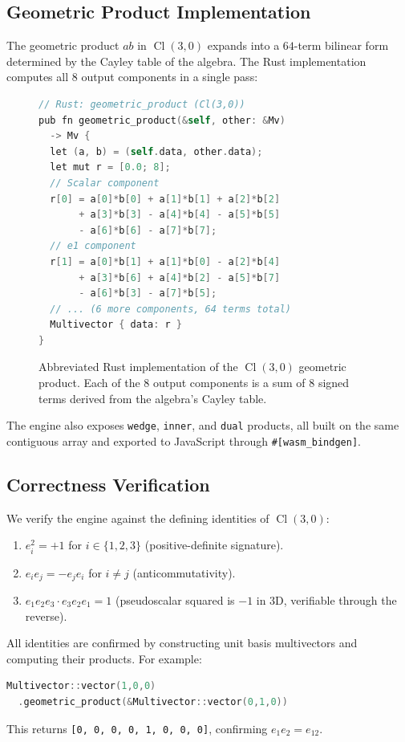 \documentclass[conference]{IEEEtran}
\begin{document}
\subsection{Geometric Product Implementation}
The geometric product $ab$ in $\operatorname{Cl}(3,0)$ expands into a $64$-term bilinear form determined by the Cayley table of the algebra. The Rust implementation computes all 8 output components in a single pass:

\begin{figure}[htbp]
\begin{lstlisting}[language=C]
// Rust: geometric_product (Cl(3,0))
pub fn geometric_product(&self, other: &Mv)
  -> Mv {
  let (a, b) = (self.data, other.data);
  let mut r = [0.0; 8];
  // Scalar component
  r[0] = a[0]*b[0] + a[1]*b[1] + a[2]*b[2]
       + a[3]*b[3] - a[4]*b[4] - a[5]*b[5]
       - a[6]*b[6] - a[7]*b[7];
  // e1 component
  r[1] = a[0]*b[1] + a[1]*b[0] - a[2]*b[4]
       + a[3]*b[6] + a[4]*b[2] - a[5]*b[7]
       - a[6]*b[3] - a[7]*b[5];
  // ... (6 more components, 64 terms total)
  Multivector { data: r }
}
\end{lstlisting}
\caption{Abbreviated Rust implementation of the $\operatorname{Cl}(3,0)$ geometric product. Each of the 8 output components is a sum of 8 signed terms derived from the algebra's Cayley table.}
\label{fig:geom_prod_code}
\end{figure}

The engine also exposes \texttt{wedge}, \texttt{inner}, and \texttt{dual} products, all built on the same contiguous array and exported to JavaScript through \texttt{\#[wasm\_bindgen]}.

\subsection{Correctness Verification}
\label{sec:verify}
We verify the engine against the defining identities of $\operatorname{Cl}(3,0)$:
\begin{enumerate}
    \item $e_i^2 = +1$ for $i \in \{1, 2, 3\}$ (positive-definite signature).
    \item $e_i e_j = -e_j e_i$ for $i \ne j$ (anticommutativity).
    \item $e_1 e_2 e_3 \cdot e_3 e_2 e_1 = 1$ (pseudoscalar squared is $-1$ in 3D, verifiable through the reverse).
\end{enumerate}
All identities are confirmed by constructing unit basis multivectors and computing their products. For example:
\begin{lstlisting}[language=C]
Multivector::vector(1,0,0)
  .geometric_product(&Multivector::vector(0,1,0))
\end{lstlisting}
This returns \texttt{[0, 0, 0, 0, 1, 0, 0, 0]}, confirming $e_1 e_2 = e_{12}$.
\end{document}
